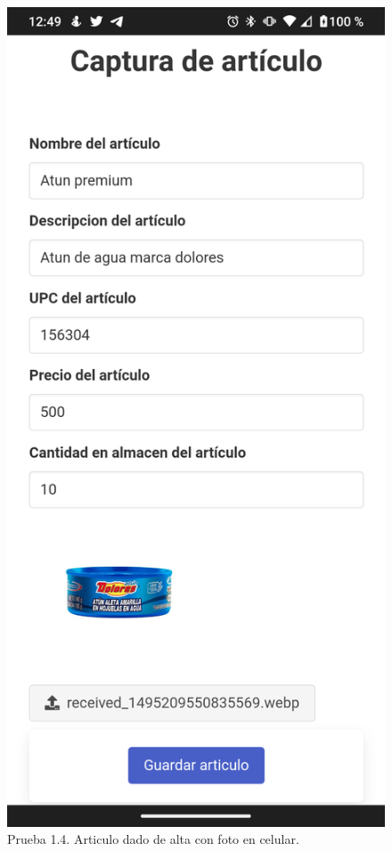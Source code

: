 \documentclass[11pt]{article}
\begin{document}
		\begin{figure}[H]
			\centering
			\includegraphics[scale=0.27]{resources/Screenshot_20211113-004912.png}
			\caption{Prueba 1.4. Articulo dado de alta con foto en celular.}\label{fig:picture}
		\end{figure}
\end{document}
